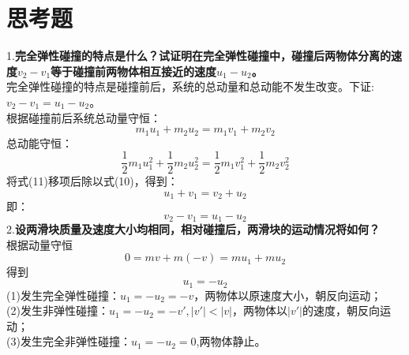 \documentclass{article}
\begin{document}
\section{思考题}
1.\textbf{完全弹性碰撞的特点是什么？试证明在完全弹性碰撞中，碰撞后两物体分离的速度\(v_2 - v_1\)等于碰撞前两物体相互接近的速度\(u_1 - u_2\)。}\\
\hspace*{2em}完全弹性碰撞的特点是碰撞前后，系统的总动量和总动能不发生改变。下证:$v_2-v_1=u_1-u_2$。\\
\hspace*{2em}根据碰撞前后系统总动量守恒：
\begin{equation}
    m_1u_1+m_2u_2=m_1v_1+m_2v_2
\end{equation}
总动能守恒：
\begin{equation}
    \frac{1}{2}m_1u_1^2+\frac12m_2u_2^2=\frac12m_1v_1^2+\frac12m_2v_2^2
\end{equation}
将式(11)移项后除以式(10)，得到：
\begin{equation*}
    u_1+v_1=v_2+u_2
\end{equation*}
即：
\begin{equation}
    v_2-v_1=u_1-u_2
\end{equation}
2.\textbf{设两滑块质量及速度大小均相同，相对碰撞后，两滑块的运动情况将如何？}\\
\hspace*{2em}根据动量守恒
\begin{equation}
    0=mv+m(-v)=mu_1+mu_2
\end{equation}
得到
\begin{equation}
    u_1=-u_2
\end{equation}
(1)发生完全弹性碰撞：$u_1=-u_2=-v$，两物体以原速度大小，朝反向运动；\\
(2)发生非弹性碰撞：$u_1=-u_2=-v',|v'|<|v|$，两物体以$|v'|$的速度，朝反向运动；\\
(3)发生完全非弹性碰撞：$u_1=-u_2=0$,两物体静止。
\end{document}
